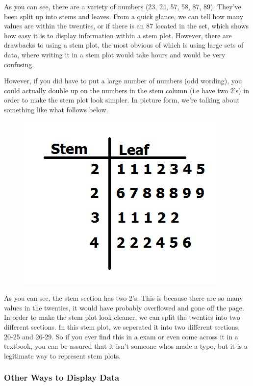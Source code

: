 \documentclass[11pt]{article}
\begin{document}
As you can see, there are a variety of numbers (23, 24, 57, 58, 87, 89). They've been split up into stems and leaves. From a quick glance, we can tell how many values are within the twenties, or if there is an 87 located in the set, which shows how easy it is to display information within a stem plot. However, there are drawbacks to using a stem plot, the most obvious of which is using large sets of data, where writing it in a stem plot would take hours and would be very confusing. 

However, if you did have to put a large number of numbers (odd wording), you could actually double up on the numbers in the stem column (i.e have two 2's) in order to make the stem plot look simpler. In picture form, we're talking about something like what follows below.

\begin{figure}[htp]
\vspace*{0.5cm}
\centering
\includegraphics[scale=1.00]{StemLeafImage2.jpg}
\end{figure}

As you can see, the stem section has two 2's. This is because there are so many values in the twenties, it would have probably overflowed and gone off the page. In order to make the stem plot look cleaner, we can split the twenties into two different sections. In this stem plot, we seperated it into two different sections, 20-25 and 26-29. So if you ever find this in a exam or even come across it in a textbook, you can be assured that it isn't someone whos made a typo, but it is a legitimate way to represent stem plots. 

\subsubsection*{Other Ways to Display Data}
\end{document}
